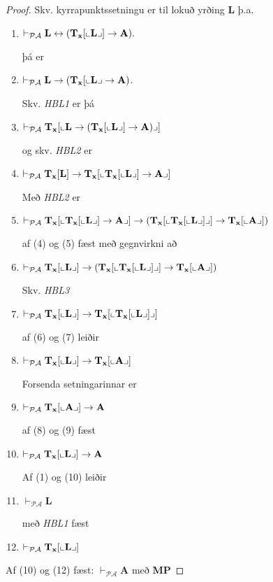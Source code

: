 \documentclass[12pt]{book}
\newcommand{\PA}{\mathcal{PA}}
\newcommand{\bA}{\mathbf{A}}
\newcommand{\bT}{\mathbf{T}}
\newcommand{\bL}{\mathbf{L}}
\newcommand{\bx}{\mathbf{x}}
\newcommand{\vP}{\vdash_{\PA}}
\newcommand{\bTx}{\bT_{\bx}}
\DeclarePairedDelimiter{\pg}{\llcorner}{\lrcorner}
\begin{document}
\begin{proof}
Skv. kyrrapunktssetningu er til lokuð yrðing $\bL$ þ.a.

\begin{enumerate}[(1)]
\item  $\vP \bL \leftrightarrow (\bT_{\bx} [\pg{\bL}] \to \bA).$

þá er
\item $\vP \bL \to (\bT_{\bx}[\pg{\bL} \to \bA)$.

Skv. \emph{HBL1} er þá
\item $\vP \bT_{\bx}[\pg{\bL \to (\bT_{\bx}[\pg{\bL}]\to \bA)}]$

og skv. \emph{HBL2} er
\item $\vP \bT_{\bx}[\bL] \to \bT_{\bx}[\pg{\bT_{\bx} [\pg{\bL}] \to \bA}]$

Með \emph{HBL2} er
\item $\vP \bT_{\bx}[\pg{\bT_{\bx}[\pg{\bL}] \to \bA}] \to (\bT_{\bx}[\pg{\bTx[\pg{\bL}]}] \to \bTx[\pg{\bA}])$

af (4) og (5) fæst með gegnvirkni að

\item  $\vP \bTx[\pg{\bL}] \to (\bTx[\pg{\bTx[\pg{\bL}]}] \to \bTx[\pg{\bA}])$

Skv. \emph{HBL3}
\item 
 $\vP \bTx [\pg{\bL}] \to \bTx [\pg{\bTx[\pg{\bL}]}]$

af (6) og (7) leiðir

\item $\vP \bTx[\pg{\bL}] \to \bTx[\pg{\bA}]$

Forsenda setningarinnar er

\item $\vP \bTx[\pg{\bA}] \to \bA$

af (8) og (9) fæst
\item $\vP \bTx [\pg{\bL}] \to \bA$

Af (1) og (10) leiðir
\item $\vP \bL$

með \emph{HBL1} fæst
\item 
 $\vP \bTx[\pg{\bL}]$
\end{enumerate}
Af (10) og (12) fæst:
$\vP \bA$ með \textbf{MP}
\end{proof}
\end{document}
